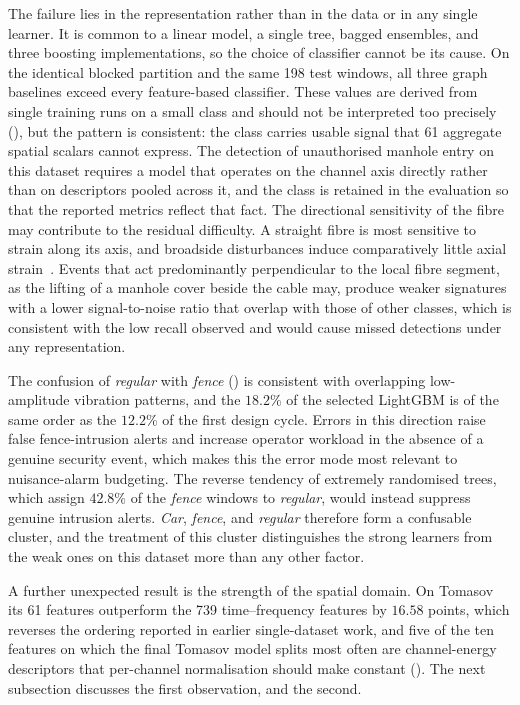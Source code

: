 The failure lies in the representation rather than in the data or in any single learner. It is common to a linear model, a single tree, bagged ensembles, and three boosting implementations, so the choice of classifier cannot be its cause. On the identical blocked partition and the same 198 test windows, all three graph baselines exceed every feature-based classifier. These values are derived from single training runs on a small class and should not be interpreted too precisely (), but the pattern is consistent: the class carries usable signal that 61 aggregate spatial scalars cannot express. The detection of unauthorised manhole entry on this dataset requires a model that operates on the channel axis directly rather than on descriptors pooled across it, and the class is retained in the evaluation so that the reported metrics reflect that fact. The directional sensitivity of the fibre may contribute to the residual difficulty. A straight fibre is most sensitive to strain along its axis, and broadside disturbances induce comparatively little axial strain~\cite{he2021review,zhan2020das}. Events that act predominantly perpendicular to the local fibre segment, as the lifting of a manhole cover beside the cable may, produce weaker signatures with a lower signal-to-noise ratio that overlap with those of other classes, which is consistent with the low recall observed and would cause missed detections under any representation.

The confusion of \emph{regular} with \emph{fence} () is consistent with overlapping low-amplitude vibration patterns, and the $18.2\%$ of the selected LightGBM is of the same order as the $12.2\%$ of the first design cycle. Errors in this direction raise false fence-intrusion alerts and increase operator workload in the absence of a genuine security event, which makes this the error mode most relevant to nuisance-alarm budgeting. The reverse tendency of extremely randomised trees, which assign $42.8\%$ of the \emph{fence} windows to \emph{regular}, would instead suppress genuine intrusion alerts. \emph{Car}, \emph{fence}, and \emph{regular} therefore form a confusable cluster, and the treatment of this cluster distinguishes the strong learners from the weak ones on this dataset more than any other factor.

A further unexpected result is the strength of the spatial domain. On Tomasov its 61 features outperform the 739 time--frequency features by $16.58$ points, which reverses the ordering reported in earlier single-dataset work, and five of the ten features on which the final Tomasov model splits most often are channel-energy descriptors that per-channel normalisation should make constant (). The next subsection discusses the first observation, and  the second.


